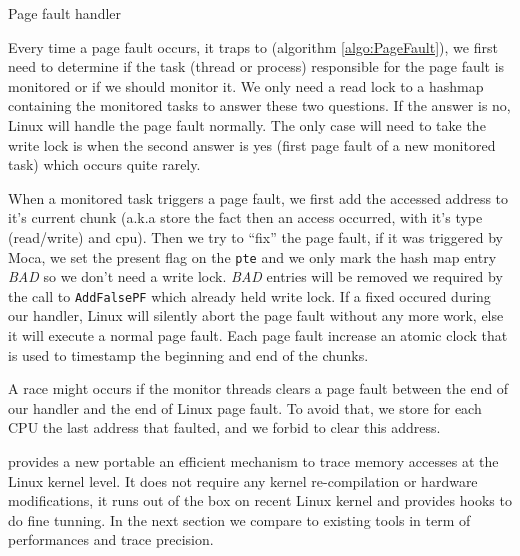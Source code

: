 \begin{algorithm}[htb]
    \caption{Page fault handler}
    \label{algo:PageFault}
    \begin{algorithmic}[1]
                    \State \Return {}
                \EndIf
            \EndIf
            \State {}
            \State {}
            \State {}
            \State {}
            \State {}
            \State {}
        \EndFunction
    \end{algorithmic}
\end{algorithm}

Every time a page fault occurs, it traps to \Moca (algorithm
\ref{algo:PageFault}), we first need to determine if the task
(thread or process) responsible for the page fault is
monitored or if we should monitor it. We only need a read lock
to a hashmap containing the monitored tasks to answer these
two questions. If the answer is no, Linux will handle the page
fault normally. The only case will need to take the write lock
is when the second answer is yes (first page fault of a new
monitored task) which occurs quite rarely.

When a monitored task triggers a page fault, we first add the accessed address
to it's current chunk (a.k.a store the fact then an access occurred, with it's
type (read/write) and cpu).  Then we try to ``fix'' the page fault, if it was
triggered by Moca, we set the present flag on the \texttt{pte} and we only
mark the hash map entry \emph{BAD} so we don't need a write lock. \emph{BAD}
entries will be removed we required by the call to \texttt{AddFalsePF} which
already held write lock. If a fixed occured during our handler, Linux will
silently abort the page fault without any more work, else it will execute a
normal page fault. Each page fault increase an atomic clock that is used to
timestamp the beginning and end of the chunks.

A race might occurs if the monitor threads clears a page fault between the
end of our handler and the end of Linux page fault. To avoid that, we store
for each CPU the last address that faulted, and we forbid to clear this
address.

\Moca provides a new portable an efficient mechanism to trace memory accesses
at the Linux kernel level. It does not require any kernel re-compilation or
hardware modifications, it runs out of the box on recent Linux kernel and
provides hooks to do fine tunning. In the next section we compare \Moca to
existing tools in term of performances and trace precision.
